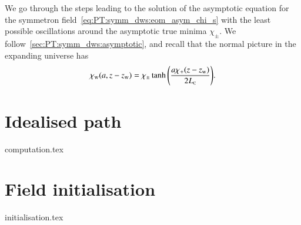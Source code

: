 



\newcommand{\brchi}{\breve{\chi}}
\newcommand{\brq}{\breve{q}}
\newcommand{\sppt}{\ALIASsppt}
\newcommand{\eqregimenum}{\ALIASeqregimenum}






We go through the steps leading to the solution of the asymptotic equation for the symmetron field~\cref{eq:PT:symm_dws:eom_asym_chi_s} with the least possible oscillations around the asymptotic true minima $\chi_\pm$.  
We follow~\cref{sec:PT:symm_dws:asymptotic}, and recall that the normal picture in the expanding universe has
\begin{equation}
    \chi_\mathrm{w}(a, z-z_\mathrm{w}) = \chi_\pm \tanh{ {\left( \frac{a\chi_+(z-z\ensuremath{_\mathrm{w}})}{2L_{\text{\tiny{C}}}}  \right)}}.
\end{equation}






\section{Idealised path}\label{app:stablesym:computation}
    {{computation.tex}}




\section{Field initialisation}\label{app:stablesym:initialisation}
    {{initialisation.tex}}